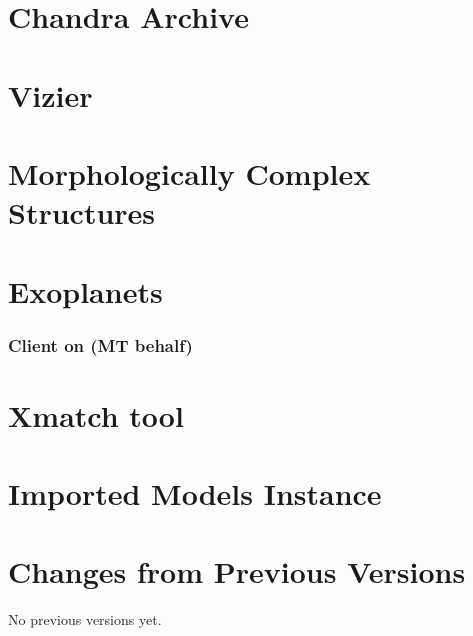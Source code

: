 \documentclass[11pt,a4paper]{ivoa}
\begin{document}
\appendix

% 

% 

\section{Chandra Archive}
\label{sec:chandra} 


\section{Vizier}


\section{Morphologically Complex Structures}


\section{Exoplanets}


\subsubsection{Client on (MT behalf)}


\section{Xmatch tool }


\section{Imported Models Instance}

\section{Changes from Previous Versions}

No previous versions yet.



\end{document}
